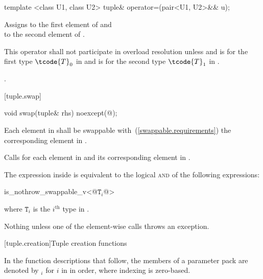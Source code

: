 %
%
\begin{itemdecl}
template <class U1, class U2> tuple& operator=(pair<U1, U2>&& u);
\end{itemdecl}

\begin{itemdescr}
\pnum
\effects Assigns  to the first
element of  and\\  to the
second element of .

\pnum
\remarks
This operator shall not participate in overload resolution unless
 and
 is  for the first type $\tcode{T}_0$ in
 and  is  for the second
type $\tcode{T}_1$ in .

\pnum
\returns {}.
\end{itemdescr}

[tuple.swap]{}

%
\begin{itemdecl}
void swap(tuple& rhs) noexcept(@\seebelow@);
\end{itemdecl}

\begin{itemdescr}
\pnum
\requires
Each element in  shall be swappable with~(\ref{swappable.requirements})
the corresponding element in .

\pnum
\effects Calls  for each element in  and its
corresponding element in .

\pnum
\remarks The expression inside  is equivalent to the logical
\textsc{and} of the following expressions:

\begin{codeblock}
is_nothrow_swappable_v<@$\mathtt{T}_i$@>
\end{codeblock}
where $\mathtt{T}_i$ is the $i^\text{th}$ type in .

\pnum
\throws Nothing unless one of the element-wise  calls throws an exception.
\end{itemdescr}

[tuple.creation]{Tuple creation functions}

\pnum
In the function descriptions that follow, the members of a parameter pack 
are denoted by $_i$ for $i$ in  in
order, where indexing is zero-based.

